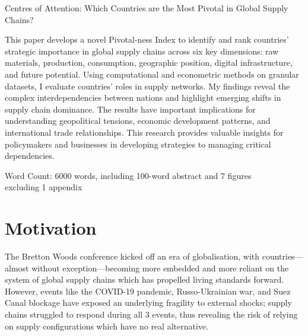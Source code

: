 \documentclass[11pt]{article}
\begin{document}

\phantom{Wendy Yu}

\vfill

\begin{center}
\begin{minipage}{0.88\linewidth}
\begin{center}
\LARGE
Centres of Attention: Which Countries are the Most Pivotal in Global Supply Chains? \\[0.21in]
\end{center}
\large This paper develops a novel Pivotal-ness Index to identify and rank countries’ strategic importance in global supply chains across six key dimensions: raw materials, production, consumption, geographic position, digital infrastructure, and future potential. Using computational and econometric methods on granular datasets, I evaluate countries’ roles in supply networks. My findings reveal the complex interdependencies between nations and highlight emerging shifts in supply chain dominance. The results have important implications for understanding geopolitical tensions, economic development patterns, and international trade relationships. This research provides valuable insights for policymakers and businesses in developing strategies to managing critical dependencies.
	\end{minipage}
\end{center}


\vfill

Word Count: 6000 words, including 100-word abstract and 7 figures\\
\phantom{Word Count: 6000 words,} excluding 1 appendix

\newpage
{}

\section{Motivation}
\label{sec:motivation}

The Bretton Woods conference kicked off an era of globalisation, with countries---almost without exception---becoming more embedded and more reliant on the system of global supply chains which has propelled living standards forward. However, events like the COVID-19 pandemic, Russo-Ukrainian war, and Suez Canal blockage have exposed an underlying fragility to external shocks; supply chains struggled to respond during all 3 events, thus revealing the risk of relying on supply configurations which have no real alternative.
\end{document}
